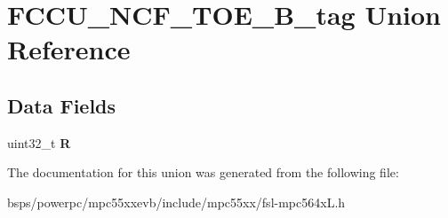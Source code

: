 \hypertarget{unionFCCU__NCF__TOE__32B__tag}{}\section{F\+C\+C\+U\+\_\+\+N\+C\+F\+\_\+\+T\+O\+E\+\_\+B\+\_\+tag Union Reference}
\label{unionFCCU__NCF__TOE__32B__tag}
\subsection*{Data Fields}
\begin{DoxyCompactItemize}
\item 
\mbox{\label{unionFCCU__NCF__TOE__32B__tag_ab626626d3fab969df02eefdccbf45367}} 
uint32\+\_\+t {\bfseries R}
\end{DoxyCompactItemize}


The documentation for this union was generated from the following file\+:\begin{DoxyCompactItemize}
\item 
bsps/powerpc/mpc55xxevb/include/mpc55xx/fsl-\/mpc564x\+L.\+h\end{DoxyCompactItemize}
